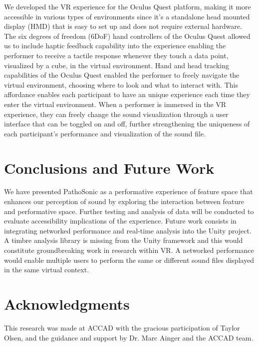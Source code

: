 \documentclass{nime-alternate}
\begin{document}
We developed the VR experience for the Oculus Quest platform, making it more accessible in various types of environments since it’s a standalone head mounted display (HMD) that is easy to set up and does not require external hardware. The six degrees of freedom (6DoF) hand controllers of the Oculus Quest allowed us to include haptic feedback capability into the experience enabling the performer to receive a  tactile response whenever they touch a data point, visualized by a cube, in the virtual environment. Hand and head tracking capabilities of the Oculus Quest enabled the performer to freely navigate the virtual environment, choosing where to look and what to interact with. This affordance enables each participant to have an unique experience each time they enter the virtual environment. When a performer is immersed in the VR experience, they can freely change the sound visualization through a user interface that can be toggled on and off, further strengthening the uniqueness of each participant's performance and visualization of the sound file. 

\section{Conclusions and Future Work}

We have presented PathoSonic as a performative experience of feature space that enhances our perception of sound by exploring the interaction between feature and performative space. Further testing and analysis of data will be conducted to evaluate accessibility implications of the experience. Future work consists in integrating networked performance and real-time analysis into the Unity project. A timbre analysis library is missing from the Unity framework and this would constitute groundbreaking work in research within VR. A networked performance would enable multiple users to perform the same or different sound files displayed in the same virtual context. 

\section{Acknowledgments}

This research was made at ACCAD with the gracious participation of Taylor Olsen, and the guidance and support by Dr. Marc Ainger and the ACCAD team.





 
\end{document}
